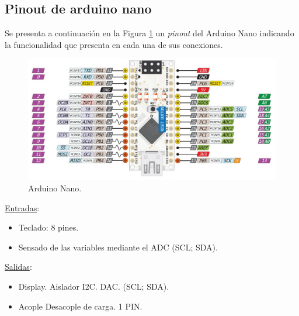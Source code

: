 \subsection{Pinout de arduino nano}
Se presenta a continuación en la Figura \ref{F:arduino_nano} un \textit{pinout} del Arduino Nano indicando la funcionalidad que presenta en cada una de sus conexiones.
\begin{figure}[H]
    \centering
    \includegraphics[width=\textwidth]{./imagenes/arduino_nano.jpg}
    \caption{Arduino Nano.}
    \label{F:arduino_nano}
\end{figure}\par 
\underline{Entradas}:
\begin{itemize}
    \item Teclado: 8 pines. 
    \item Sensado de las variables mediante el ADC (SCL; SDA).
\end{itemize}\par 
\underline{Salidas}:
\begin{itemize}
    \item Display. Aislador I2C. DAC.  (SCL; SDA).
    \item Acople Desacople de carga. 1 PIN.
\end{itemize}\par 

